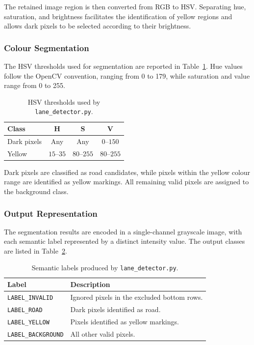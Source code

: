 \documentclass[a4paper,11pt,oneside]{book}
\begin{document}
The retained image region is then converted from RGB to HSV.
Separating hue, saturation, and brightness facilitates the
identification of yellow regions and allows dark pixels to be
selected according to their brightness. 

\subsubsection{Colour Segmentation}

The HSV thresholds used for segmentation are reported in
Table~\ref{tab:lane_detector_thresholds}. Hue values follow the
OpenCV convention, ranging from 0 to 179, while saturation and
value range from 0 to 255.

\begin{table}[H]
    \centering
    \begin{tabular}{lccc}
        \toprule
        \textbf{Class} & \textbf{H} & \textbf{S} & \textbf{V} \\
        \midrule
        Dark pixels & Any & Any & $0$--$150$ \\
        Yellow      & $15$--$35$ & $80$--$255$ & $80$--$255$ \\
        \bottomrule
    \end{tabular}
    \caption{HSV thresholds used by \texttt{lane\_detector.py}.}
    \label{tab:lane_detector_thresholds}
\end{table}

Dark pixels are classified as road candidates, while pixels within
the yellow colour range are identified as yellow markings.
All remaining valid pixels are assigned to the background class.

\subsubsection{Output Representation}

The segmentation results are encoded in a single-channel grayscale
image, with each semantic label represented by a distinct intensity
value. The output classes are listed in
Table~\ref{tab:lane_detector_labels}.

\begin{table}[H]
    \centering
    \begin{tabular}{lp{}}
        \toprule
        \textbf{Label} & \textbf{Description} \\
        \midrule
        \texttt{LABEL\_INVALID}
        & Ignored pixels in the excluded bottom rows. \\

        \texttt{LABEL\_ROAD}
        & Dark pixels identified as road. \\

        \texttt{LABEL\_YELLOW}
        & Pixels identified as yellow markings. \\

        \texttt{LABEL\_BACKGROUND}
        & All other valid pixels. \\
        \bottomrule
    \end{tabular}
    \caption{Semantic labels produced by \texttt{lane\_detector.py}.}
    \label{tab:lane_detector_labels}
\end{table}
\end{document}

